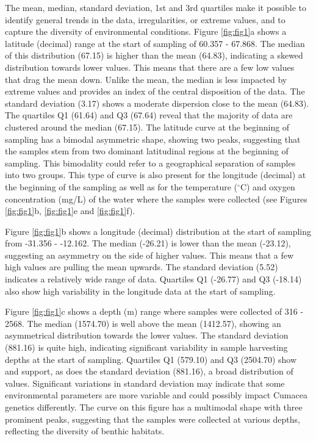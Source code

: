 The mean, median, standard deviation, 1st and 3rd quartiles make it possible to identify general trends in the data, irregularities, or extreme values, and to capture the diversity of environmental conditions. Figure \ref{fig:fig1}a shows a latitude (decimal) range at the start of sampling of 60.357 - 67.868. The median of this distribution (67.15) is higher than the mean (64.83), indicating a skewed distribution towards lower values. This means that there are a few low values that drag the mean down. Unlike the mean, the median is less impacted by extreme values and provides an index of the central disposition of the data.  The standard deviation (3.17) shows a moderate dispersion close to the mean (64.83). The quartiles Q1 (61.64) and Q3 (67.64) reveal that the majority of data are clustered around the median (67.15). The latitude curve at the beginning of sampling has a bimodal asymmetric shape, showing two peaks, suggesting that the samples stem from two dominant latitudinal regions at the beginning of sampling. This bimodality could refer to a geographical separation of samples into two groups. This type of curve is also present for the longitude (decimal) at the beginning of the sampling as well as for the temperature ($^\circ$C) and oxygen concentration (mg/L) of the water where the samples were collected (see Figures \ref{fig:fig1}b, \ref{fig:fig1}e and \ref{fig:fig1}f). 

Figure \ref{fig:fig1}b shows a longitude (decimal) distribution at the start of sampling from -31.356 - -12.162. The median (-26.21) is lower than the mean (-23.12), suggesting an asymmetry on the side of higher values. This means that a few high values are pulling the mean upwards. The standard deviation (5.52) indicates a relatively wide range of data. Quartiles Q1 (-26.77) and Q3 (-18.14) also show high variability in the longitude data at the start of sampling.

Figure \ref{fig:fig1}c shows a depth (m) range where samples were collected of 316 - 2568. The median (1574.70) is well above the mean (1412.57), showing an asymmetrical distribution towards the lower values. The standard deviation (881.16) is quite high, indicating significant variability in sample harvesting depths at the start of sampling. Quartiles Q1 (579.10) and Q3 (2504.70) show and support, as does the standard deviation (881.16), a broad distribution of values. Significant variations in standard deviation may indicate that some environmental parameters are more variable and could possibly impact Cumacea genetics differently. The curve on this figure has a multimodal shape with three prominent peaks, suggesting that the samples were collected at various depths, reflecting the diversity of benthic habitats.

